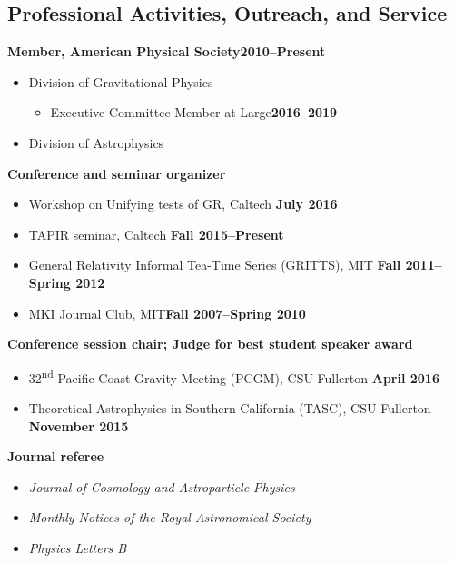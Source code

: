 \documentclass[margin,line]{res}
\begin{document}
\begin{resume}
\ifx\nopubs\undefined

\else
%
\fi



\section{\sc Professional Activities, Outreach, and Service}
{\bf Member, American Physical Society}\hfill{\bf 2010--Present}
\vspace*{.05in}  
\begin{itemize}
\item[] Division of Gravitational Physics
  \begin{itemize}
  \item[] Executive Committee Member-at-Large\hfill{\bf 2016--2019}
  \end{itemize}
\item[] Division of Astrophysics
\end{itemize}
{\bf Conference and seminar organizer}
\vspace*{.05in}
\begin{itemize}
\item[] Workshop on Unifying tests of GR, Caltech\hfill
  {\bf July 2016}
\item[] TAPIR seminar, Caltech\hfill
  {\bf Fall 2015--Present}
\item[] General Relativity Informal Tea-Time Series (GRITTS), MIT\hfill
  {\bf Fall 2011--Spring 2012}
\item[] MKI Journal Club, MIT\hfill {\bf Fall 2007--Spring 2010}
\end{itemize}
{\bf Conference session chair; Judge for best student speaker award}
\vspace*{.05in}
\begin{itemize}
\item[]
32\textsuperscript{nd} Pacific Coast Gravity Meeting (PCGM),
CSU Fullerton
\hfill {\bf April 2016}
\item[]
Theoretical Astrophysics in Southern California (TASC),
CSU Fullerton
\hfill {\bf November 2015}
\end{itemize}
{\bf Journal referee}
\vspace*{.05in}
\begin{itemize}
\item[] {\it Journal of Cosmology and Astroparticle Physics}
\item[] {\it Monthly Notices of the Royal Astronomical Society}
\item[] {\it Physics Letters B}

\end{itemize}
\end{resume}
\end{document}
